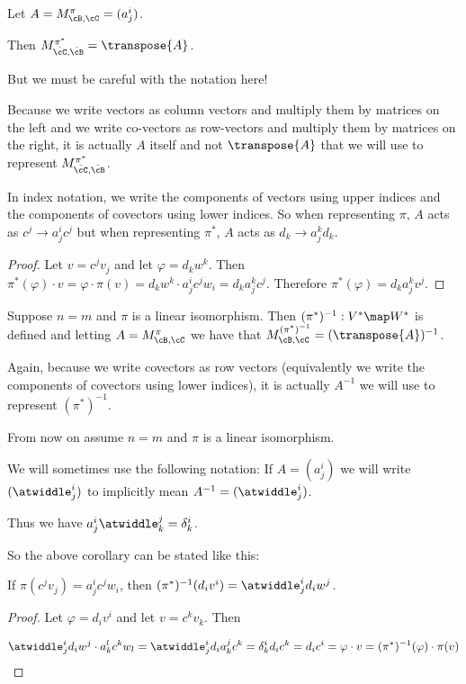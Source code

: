 \documentclass[oneside,12pt]{amsart}
\begin{document}
\begin{lemma}
Let $A = M^{\pi}_{\cB,\cC} =(a^i_j)$.

Then $M^{\pi^*}_{\hat{\cC},\hat{\cB}}  = \transpose{A}$.

But we must be careful with the notation here!

Because we write vectors as column vectors and multiply them by matrices on the left
and we write co-vectors as row-vectors and multiply them by matrices on the right, it
is actually $A$ itself and not $\transpose{A}$ that we will use to represent
$M^{\pi^*}_{\hat{\cC},\hat{\cB}}$.


In index notation, we write the components of vectors using upper indices and the components
of covectors using lower indices. So when representing $\pi$, $A$ acts as
$c^j \to a^i_jc^j$ but when representing $\pi^*$, $A$ acts as $d_k \to a^k_j d_k$.
\end{lemma}
\begin{proof}
Let $v=c^j v_j$ and let $\varphi = d_k w^k$. Then $\pi^*(\varphi)\cdot v = \varphi \cdot \pi(v)
= d_k w^k \cdot a^i_j c^j w_i = d_k a^k_j c ^ j$. Therefore $\pi^*(\varphi) = d_k a^k_j v^j$.
\end{proof}

\begin{corollary}
Suppose $n=m$ and $\pi$ is a linear isomorphism. Then
$(\pi^*)^{-1}:V^* \map W^*$ is defined
and letting $A = M^{\pi}_{\cB,\cC}$ we have that
$M^{(\pi^*)^{-1}}_{\cB,\cC} = (\transpose{A})^{-1}$.

Again, because we write covectors as row vectors (equivalently we write the components of covectors using lower indices), it is actually $A^{-1}$ we will use to represent $(\pi^*)^{-1}.$

\end{corollary}

From now on assume $n=m$ and $\pi$ is a linear isomorphism. 

We will sometimes use the following notation:
If $A =(a^i_j)$ we will write $(\atwiddle^i_j)$ to implicitly
mean $A^{-1} = (\atwiddle^i_j)$.

Thus we have $a^i_j \atwiddle^j_k = \delta^i_k$.

So the above corollary can be stated like this:

If $\pi(c^j v_j) = a^i_j c^j w_i$, then
$(\pi^*)^{-1} (d_i v^i) = \atwiddle^i_j d_i w^j$.

\begin{proof}
Let $\varphi = d_i v^i$ and let $v=c^k v_k$.
Then 

$$\atwiddle^i_j d_i w^j \cdot a^l_k c^k w_l = 
\atwiddle^i_j d_i  a^j_k c^k =
\delta^i_k d_i c^k =
d_i c^i = \varphi \cdot v = (\pi^*)^{-1}(\varphi) \cdot \pi(v)$$

\end{proof}
\end{document}
